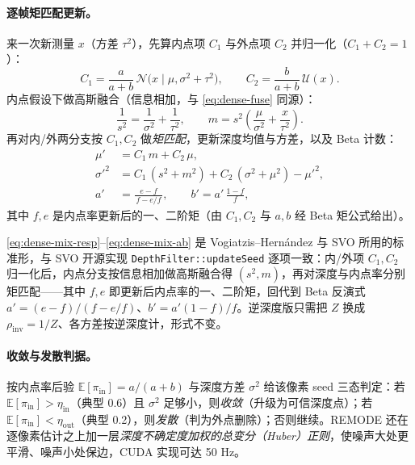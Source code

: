 \paragraph{逐帧矩匹配更新。}
来一次新测量 $x$（方差 $\tau^2$），先算内点项 $C_1$ 与外点项 $C_2$ 并归一化（$C_1+C_2=1$）：
\begin{equation}
  C_1=\frac{a}{a+b}\,\mathcal{N}\!\bigl(x\mid\mu,\sigma^2+\tau^2\bigr),\qquad
  C_2=\frac{b}{a+b}\,\mathcal{U}(x).
  \label{eq:dense-mix-resp}
\end{equation}
内点假设下做高斯融合（信息相加，与 \cref{eq:dense-fuse} 同源）：
\begin{equation}
  \frac{1}{s^2}=\frac{1}{\sigma^2}+\frac{1}{\tau^2},\qquad
  m=s^2\!\left(\frac{\mu}{\sigma^2}+\frac{x}{\tau^2}\right).
  \label{eq:dense-mix-kalman}
\end{equation}
再对内/外两分支按 $C_1,C_2$ 做\emph{矩匹配}，更新深度均值与方差，以及 Beta 计数：
\begin{align}
  \mu' &= C_1\,m + C_2\,\mu, \label{eq:dense-mix-mu}\\
  \sigma'^2 &= C_1\,(s^2+m^2) + C_2\,(\sigma^2+\mu^2) - \mu'^2, \label{eq:dense-mix-sig}\\
  a' &= \frac{e-f}{\,f-e/f\,},\qquad b'=a'\,\frac{1-f}{f}, \label{eq:dense-mix-ab}
\end{align}
其中 $f,e$ 是内点率更新后的一、二阶矩（由 $C_1,C_2$ 与 $a,b$ 经 Beta 矩公式给出）。

\begin{note}
\cref{eq:dense-mix-resp}--\cref{eq:dense-mix-ab} 是 Vogiatzis--Hernández\cite{vogiatzis2011video} 与 SVO\cite{forster2017svo} 所用的标准形，与 SVO 开源实现 \texttt{DepthFilter::updateSeed} 逐项一致：内/外项 $C_1,C_2$ 归一化后，内点分支按信息相加做高斯融合得 $(s^2,m)$，再对深度与内点率分别矩匹配——其中 $f,e$ 即更新后内点率的一、二阶矩，回代到 Beta 反演式 $a'=(e-f)/(f-e/f)$、$b'=a'(1-f)/f$。逆深度版只需把 $Z$ 换成 $\rho_{\mathrm{inv}}=1/Z$、各方差按逆深度计，形式不变。
\end{note}

\paragraph{收敛与发散判据。}
按内点率后验 $\mathbb{E}[\pi_{\mathrm{in}}]=a/(a+b)$ 与深度方差 $\sigma^2$ 给该像素 seed 三态判定\cite{pizzoli2014remode}：若 $\mathbb{E}[\pi_{\mathrm{in}}]>\eta_{\mathrm{in}}$（典型 0.6）且 $\sigma^2$ 足够小，则\emph{收敛}（升级为可信深度点）；若 $\mathbb{E}[\pi_{\mathrm{in}}]<\eta_{\mathrm{out}}$（典型 0.2），则\emph{发散}（判为外点删除）；否则继续。REMODE 还在逐像素估计之上加一层\emph{深度不确定度加权的总变分（Huber）正则}，使噪声大处更平滑、噪声小处保边，CUDA 实现可达 50 Hz。

